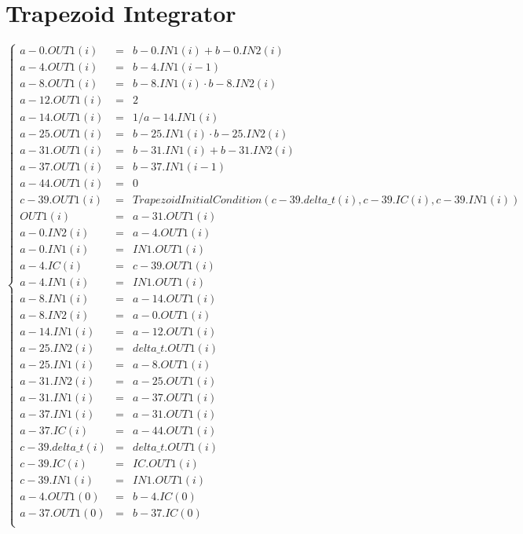 \documentclass{article}
\begin{document}
\section{Trapezoid Integrator}
$$
\left\{\begin{array}{lcl}
	a-0.OUT1(i) &=& b-0.IN1\left(i\right) + b-0.IN2\left(i\right)\\
	a-4.OUT1(i) &=& b-4.IN1\left(i-1\right)\\
	a-8.OUT1(i) &=& b-8.IN1\left(i\right) \cdot  b-8.IN2\left(i\right)\\
	a-12.OUT1(i) &=& 2\\
	a-14.OUT1(i) &=& 1/a-14.IN1\left(i\right)\\
	a-25.OUT1(i) &=& b-25.IN1\left(i\right) \cdot  b-25.IN2\left(i\right)\\
	a-31.OUT1(i) &=& b-31.IN1\left(i\right) + b-31.IN2\left(i\right)\\
	a-37.OUT1(i) &=& b-37.IN1\left(i-1\right)\\
	a-44.OUT1(i) &=& 0\\
	c-39.OUT1(i) &=& TrapezoidInitialCondition\left(c-39.delta\_t\left(i\right), c-39.IC\left(i\right), c-39.IN1\left(i\right)\right)\\
	OUT1(i) &=& a-31.OUT1\left(i\right)\\
	a-0.IN2(i) &=& a-4.OUT1\left(i\right)\\
	a-0.IN1(i) &=& IN1.OUT1\left(i\right)\\
	a-4.IC(i) &=& c-39.OUT1\left(i\right)\\
	a-4.IN1(i) &=& IN1.OUT1\left(i\right)\\
	a-8.IN1(i) &=& a-14.OUT1\left(i\right)\\
	a-8.IN2(i) &=& a-0.OUT1\left(i\right)\\
	a-14.IN1(i) &=& a-12.OUT1\left(i\right)\\
	a-25.IN2(i) &=& delta\_t.OUT1\left(i\right)\\
	a-25.IN1(i) &=& a-8.OUT1\left(i\right)\\
	a-31.IN2(i) &=& a-25.OUT1\left(i\right)\\
	a-31.IN1(i) &=& a-37.OUT1\left(i\right)\\
	a-37.IN1(i) &=& a-31.OUT1\left(i\right)\\
	a-37.IC(i) &=& a-44.OUT1\left(i\right)\\
	c-39.delta\_t(i) &=& delta\_t.OUT1\left(i\right)\\
	c-39.IC(i) &=& IC.OUT1\left(i\right)\\
	c-39.IN1(i) &=& IN1.OUT1\left(i\right)\\
	a-4.OUT1(0) &=& b-4.IC(0)\\
	a-37.OUT1(0) &=& b-37.IC(0)\\
\end{array}\right.
$$
\end{document}

